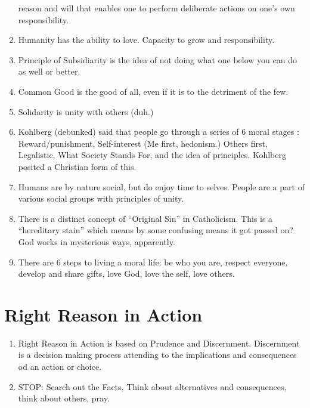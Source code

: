 \documentclass[10pt]{article}
\begin{document}
\begin{enumerate}
	reason and will that enables one to perform deliberate actions 
	on one's own responsibility.  
\item Humanity has the ability to love.  Capacity to grow and responsibility.
\item Principle of Subsidiarity is the idea of not doing what one 
	below you can do as well or better.
\item Common Good is the good of all, even if it is to the detriment 
	of the few.
\item Solidarity is unity with others (duh.)
\item Kohlberg (debunked) said that people go through a series of 6 
	moral stages : Reward/punishment, Self-interest (Me first, 
        hedonism.) Others first, Legalistic, What Society Stands For,
        and the idea of principles.  Kohlberg posited a Christian form
        of this.
\item Humans are by nature social, but do enjoy time to selves.  People are a
        part of various social groups with principles of unity.
\item There is a distinct concept of ``Original Sin'' in Catholicism.  This 
  is a ``hereditary stain'' which means by some confusing means it got passed
  on?  God works in mysterious ways, apparently.
\item There are 6 steps to living a moral life: be who you are, respect
  everyone, develop and share gifts, love God, love the self, love others.
\end{enumerate}
\section{Right Reason in Action}
\begin{enumerate}
  \item Right Reason in Action is based on Prudence and Discernment.  Discernment is a decision making process attending to the implications and consequences od an action or choice.
  \item STOP: Search out the Facts, Think about alternatives and consequences, think about others, pray.
\end{enumerate}
\end{document}
